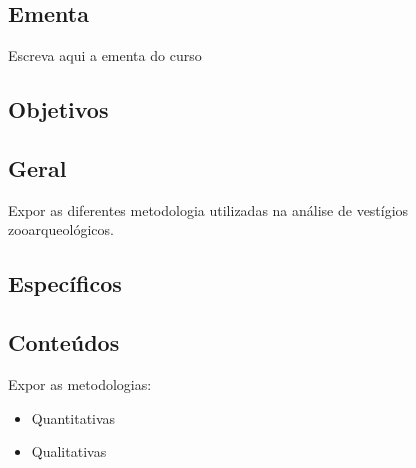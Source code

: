   \begin{snugshade}
  \section{Ementa}
  \end{snugshade}
  
  Escreva aqui a ementa do curso
  
  \begin{snugshade}
  \section{Objetivos} %
  \end{snugshade}
  
    \subsection{Geral} %

	Expor as diferentes metodologia utilizadas na análise de vestígios zooarqueológicos.\parencite{Albarella2001}
    
    \subsection{Específicos} %
    
%      
%     
  
  \begin{snugshade}
  \section{Conteúdos} %
  \end{snugshade}

Expor as metodologias:
      \begin{itemize}
      
		\item Quantitativas
		\item Qualitativas
      
      \end{itemize}

